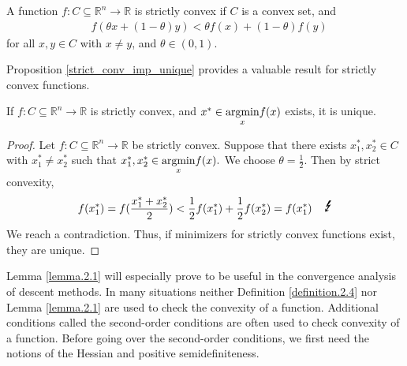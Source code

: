 \begin{definition}\label{strict_convexity}
A function $f: C\subseteq\mathbb{R}^{n} \longrightarrow \mathbb{R}$ is strictly convex if $C$ is a convex set, and
\begin{equation*}\label{eq:strict_conv}\tag{3.2.3}
\begin{aligned}
    &f(\theta x + (1-\theta) y) < \theta f(x) + (1-\theta) f(y)
\end{aligned}
\end{equation*}
for all $x,y \in C$ with $x\neq y$, and $\theta\in (0,1)$.
\end{definition}    
Proposition \ref{strict_conv_imp_unique} provides a valuable result for strictly convex functions.
\begin{proposition}\label{strict_conv_imp_unique}
If $f:C\subseteq\mathbb{R}^{n}\longrightarrow\mathbb{R}$ is strictly convex, and $x^{*}\in\underset{x}{\textnormal{argmin}}f(x)$ exists, it is unique.
\end{proposition}
\begin{proof}
Let $f:C\subseteq\mathbb{R}^{n}\longrightarrow\mathbb{R}$ be strictly convex. Suppose that there exists $x_{1}^{*}, x_{2}^{*}\in C$ with $x_{1}^{*}\neq x_{2}^{*}$ such that $x_{1}^{*}, x_{2}^{*} \in \underset{x}{\textnormal{argmin}}f(x).$ We choose $\theta=\frac{1}{2}.$ Then by strict convexity, 
\begin{equation*}
f(x_{1}^{*}) = f(\frac{x_{1}^{*}+x_{2}^{*}}{2}) < \frac{1}{2} f(x_{1}^{*}) + \frac{1}{2} f(x_{2}^{*}) = f(x_{1}^{*}) \hspace{0.4cm} \text{{\Large \Lightning}}
\end{equation*}
We reach a contradiction. Thus, if minimizers for strictly convex functions exist, they are unique. 
\end{proof}
Lemma \ref{lemma.2.1} will especially prove to be useful in the convergence analysis of descent methods. In many situations neither Definition \ref{definition.2.4} nor Lemma \ref{lemma.2.1} are used to check the convexity of a function. Additional conditions called the second-order conditions are often used to check convexity of a function. Before going over the second-order conditions, we first need the notions of the Hessian and positive semidefiniteness. 
